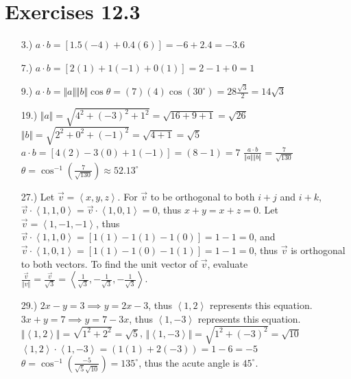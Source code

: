 \documentclass[12pt]{article}
\newcommand{\angleb}[1]{\left\langle#1\right\rangle}
\begin{document}
\section*{Exercises 12.3}
\begin{itemize}
    \item [3.)] $a\cdot b=[1.5(-4)+0.4(6)]=-6+2.4=-3.6$

    \item [7.)] $a\cdot b=[2(1)+1(-1)+0(1)]=2-1+0=1$

    \item [9.)] $a\cdot b=\Vert a\Vert\Vert b\Vert\cos\theta=(7)(4)\cos(30^\circ)=28\frac{\sqrt{3}}{2}=14\sqrt{3}$

    \item [19.)] $\Vert a\Vert=\sqrt{4^2+(-3)^2+1^2}=\sqrt{16+9+1}=\sqrt{26}$\newline
    $\Vert b\Vert=\sqrt{2^2+0^2+(-1)^2}=\sqrt{4+1}=\sqrt{5}$\newline
    $a\cdot b=[4(2)-3(0)+1(-1)]=(8-1)=7$\newline
    $\frac{a\cdot b}{\Vert a\Vert\Vert b\Vert}=\frac{7}{\sqrt{130}}$\newline
    $\theta=\cos^{-1}(\frac{7}{\sqrt{130}})\approx52.13^\circ$

    \item [27.)] Let $\vec{v}=\angleb{x,y,z}$. For $\vec{v}$ to be orthogonal to both $i+j$ and $i+k$, $\vec{v}\cdot\angleb{1,1,0}=\vec{v}\cdot\angleb{1,0,1}=0$, thus $x+y=x+z=0$. Let $\vec{v}=\angleb{1,-1,-1}$, thus $\vec{v}\cdot\angleb{1,1,0}=[1(1)-1(1)-1(0)]=1-1=0$, and $\vec{v}\cdot\angleb{1,0,1}=[1(1)-1(0)-1(1)]=1-1=0$, thus $\vec{v}$ is orthogonal to both vectors. To find the unit vector of $\vec{v}$, evaluate $\frac{\vec{v}}{\Vert v\Vert}=\frac{\vec{v}}{\sqrt{3}}=\angleb{\frac{1}{\sqrt{3}},-\frac{1}{\sqrt{3}},-\frac{1}{\sqrt{3}}}$.

    \item [29.)] $2x-y=3\implies y=2x-3$, thus $\angleb{1,2}$ represents this equation.\newline
    $3x+y=7\implies y=7-3x$, thus $\angleb{1,-3}$ represents this equation.\newline
    $\Vert\angleb{1,2}\Vert=\sqrt{1^2+2^2}=\sqrt{5}$, $\Vert\angleb{1,-3}\Vert=\sqrt{1^2+(-3)^2}=\sqrt{10}$\newline
    $\angleb{1,2}\cdot\angleb{1,-3}=(1(1)+2(-3))=1-6=-5$\newline
    $\theta=\cos^{-1}\left(\frac{-5}{\sqrt{5}\sqrt{10}}\right)=135^\circ$, thus the acute angle is $45^\circ$.
\end{itemize}
\end{document}
